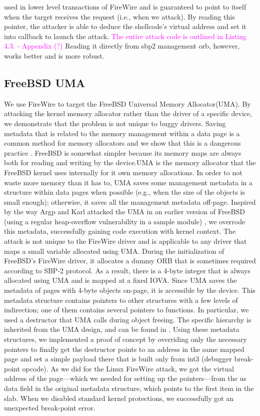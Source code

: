 used in lower level transactions of FireWire and is guaranteed to point to itself when the target receives the request (i.e., when we attack). By reading this pointer, the attacker is able to deduce the shellcode’s virtual address and set it into callback to launch the attack. \textcolor{magenta}{The entire attack code is outlined in Listing 4.3. - Appendix (?) } Reading it directly from sbp2 management orb, however, works better and is more robust.
\subsection{FreeBSD UMA}
We use FireWire to target the FreeBSD Universal Memory Allocator(UMA). By attacking the kernel memory allocator rather than the driver of a specific device, we demonstrate that the problem is not unique to buggy drivers. Saving metadata that is related to the memory management within a data page is a common method for memory allocators and we show that this is a dangerous practice \cite{Cor07, ak09}. FreeBSD is somewhat simpler because its memory maps are always both for reading and writing by the device.UMA is the memory allocator that the FreeBSD kernel uses internally for it own memory allocations. In order to not waste more memory than it has to, UMA saves some management metadata in a structure within data pages when possible (e.g., when the size of the objects is small enough); otherwise, it saves all the management metadata off-page. Inspired by the way Argp and Karl attacked the UMA in an earlier version of FreeBSD (using a regular heap-overflow vulnerability in a sample module) \cite{ak09}, we overrode this metadata, successfully gaining code execution with kernel context. The attack is not unique to the FireWire driver and is applicable to any driver that maps a small variable allocated using UMA. During the initialization of FreeBSD’s FireWire driver, it allocates a dummy ORB that is sometimes required according to SBP-2 protocol. As a result, there is a 4-byte integer that is always allocated using UMA and is mapped at a fixed IOVA. Since UMA saves the metadata of pages with 4-byte objects on-page, it is accessible by the device. This metadata structure contains pointers to other structures with a few levels of indirection; one of them contains several pointers to functions. In particular, we used a destructor that UMA calls during object freeing. The specific hierarchy is inherited from the UMA design, and can be found in \cite{aA10}. Using these metadata structures, we implemented a proof of concept by overriding only the necessary pointers to finally get the destructor points to an address in the same mapped page and set a simple payload there that is built only from int3 (debugger break-point opcode). As we did for the Linux FireWire attack, we got the virtual address of the page—which we needed for setting up the pointers—from the us data field in the original metadata structure, which points to the first item in the slab. When we disabled standard kernel protections, we successfully got an unexpected break-point error.